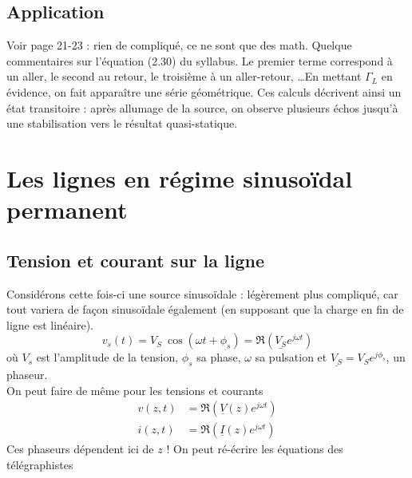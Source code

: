 	\subsection{Application}
	Voir page 21-23 : rien de compliqué, ce ne sont que des math. Quelque commentaires sur 
	l'équation (2.30) du syllabus. Le premier terme correspond à un aller, le second au 
	retour, le troisième à un aller-retour, \dots En mettant $\Gamma_L$ en évidence, on fait 
	apparaître une série géométrique. Ces calculs décrivent ainsi un état transitoire : après 
	allumage de la source, on observe plusieurs échos jusqu'à une stabilisation vers le 
	résultat quasi-statique.
	
\section{Les lignes en régime sinusoïdal permanent}
	\subsection{Tension et courant sur la ligne}
	\label{sec:2.5.1}
	Considérons cette fois-ci une source sinusoïdale : légèrement plus compliqué, car tout 
	variera de façon sinusoïdale également (en supposant que la charge en fin de ligne est 
	linéaire).
	\begin{equation}
	v_s(t) = V_S\ \cos(\omega t + \phi_s) = \Re\left(\underline{V_S}e^{j\omega t}\right)
	\end{equation}
	où $V_s$ est l’amplitude de la tension, $\phi_s$ sa phase, $\omega$ sa pulsation et 
	$\underline{V_S} = V_Se^{j\phi_s}$, un phaseur.\\
	On peut faire de même pour les tensions et courants
	\begin{equation}
	\begin{array}{ll}
	v(z,t) &= \Re \left(\underline{V}(z)e^{j\omega t}\right)\\
	i(z,t) &= \Re \left(\underline{I}(z)e^{j\omega t}\right)	
	\end{array}
	\end{equation}
	\danger Ces phaseurs dépendent ici de $z$ ! On peut ré-écrire les équations des 
	télégraphistes\\
	\ \\
	
